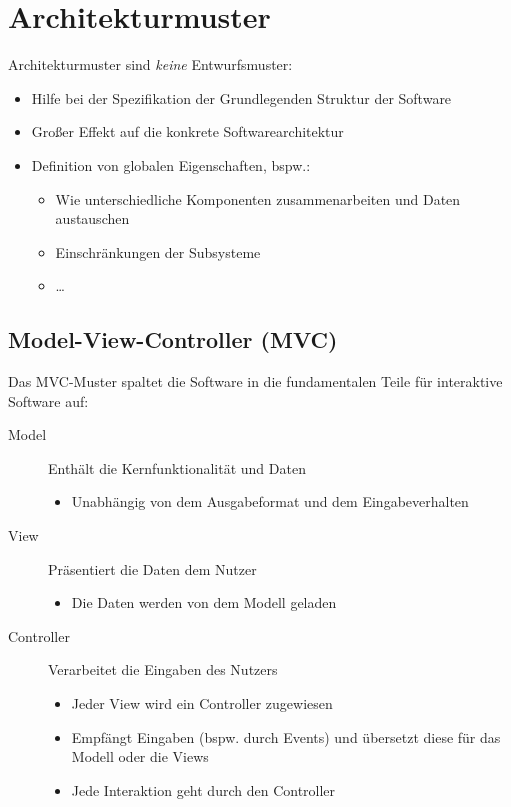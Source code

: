 	\section{Architekturmuster}
		Architekturmuster sind \textit{keine} Entwurfsmuster:
		\begin{itemize}
			\item Hilfe bei der Spezifikation der Grundlegenden Struktur der Software
			\item Großer Effekt auf die konkrete Softwarearchitektur
			\item Definition von globalen Eigenschaften, bspw.:
				\begin{itemize}
					\item Wie unterschiedliche Komponenten zusammenarbeiten und Daten austauschen
					\item Einschränkungen der Subsysteme
					\item \dots
				\end{itemize}
		\end{itemize}

		\subsection{Model-View-Controller (MVC)}
			Das MVC-Muster spaltet die Software in die fundamentalen Teile für interaktive Software auf:
			\begin{description}
				\item[Model] Enthält die Kernfunktionalität und Daten
					\begin{itemize}
						\item Unabhängig von dem Ausgabeformat und dem Eingabeverhalten
					\end{itemize}
				\item[View] Präsentiert die Daten dem Nutzer
					\begin{itemize}
						\item Die Daten werden von dem Modell geladen
					\end{itemize}
				\item[Controller] Verarbeitet die Eingaben des Nutzers
					\begin{itemize}
						\item Jeder View wird ein Controller zugewiesen
						\item Empfängt Eingaben (bspw. durch Events) und übersetzt diese für das Modell oder die Views
						\item Jede Interaktion geht durch den Controller
					\end{itemize}
			\end{description}

